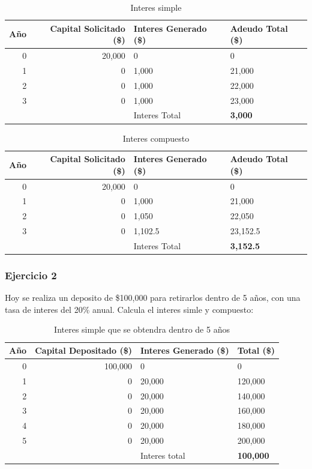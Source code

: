 \documentclass[11pt]{article}
\begin{document}
\begin{table}[htbp]
\centering
\begin{tabular}{rrll}
Año & Capital Solicitado (\$) & Interes Generado (\$) & Adeudo Total (\$)\\
\hline
0 & 20,000 & 0 & 0\\
1 & 0 & 1,000 & 21,000\\
2 & 0 & 1,000 & 22,000\\
3 & 0 & 1,000 & 23,000\\
\hline
 &  & Interes Total & \textbf{3,000}\\
\end{tabular}
\caption{Interes simple}

\end{table}

\begin{table}[htbp]
\centering
\begin{tabular}{rrll}
Año & Capital Solicitado (\$) & Interes Generado (\$) & Adeudo Total (\$)\\
\hline
0 & 20,000 & 0 & 0\\
1 & 0 & 1,000 & 21,000\\
2 & 0 & 1,050 & 22,050\\
3 & 0 & 1,102.5 & 23,152.5\\
\hline
 &  & Interes Total & \textbf{3,152.5}\\
\end{tabular}
\caption{Interes compuesto}

\end{table}

\pagebreak

\subsubsection*{Ejercicio 2}
\label{sec:org6b18d6e}
Hoy se realiza un deposito de \$100,000 para retirarlos dentro de 5 años, con una tasa de interes del 20\% anual. Calcula el interes simle y compuesto:

\begin{table}[htbp]
\centering
\begin{tabular}{rrll}
Año & Capital Depositado (\$) & Interes Generado (\$) & Total (\$)\\
\hline
0 & 100,000 & 0 & 0\\
1 & 0 & 20,000 & 120,000\\
2 & 0 & 20,000 & 140,000\\
3 & 0 & 20,000 & 160,000\\
4 & 0 & 20,000 & 180,000\\
5 & 0 & 20,000 & 200,000\\
\hline
 &  & Interes total & \textbf{100,000}\\
\end{tabular}
\caption{Interes simple que se obtendra dentro de 5 años}

\end{table}
\end{document}
